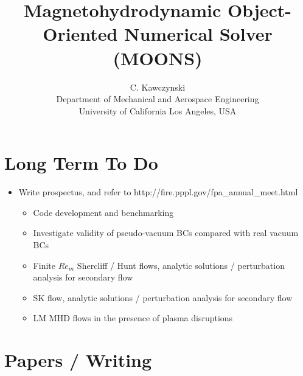\documentclass[11pt]{article}
\begin{document}
\doublespacing
\title{Magnetohydrodynamic Object-Oriented Numerical Solver (MOONS)}
\author{C. Kawczynski \\
Department of Mechanical and Aerospace Engineering \\
University of California Los Angeles, USA\\
}
\maketitle

\section{Long Term To Do}

\begin{itemize}
\item Write prospectus, and refer to http://fire.pppl.gov/fpa\_annual\_meet.html
\begin{itemize}
\item Code development and benchmarking \Checkmark
\item Investigate validity of pseudo-vacuum BCs compared with real vacuum BCs
\item Finite $Re_m$ Shercliff / Hunt flows, analytic solutions / perturbation analysis for secondary flow
\item SK flow, analytic solutions / perturbation analysis for secondary flow
\item LM MHD flows in the presence of plasma disruptions
\end{itemize}
\end{itemize}

\newpage

\section{Papers / Writing}
\end{document}
